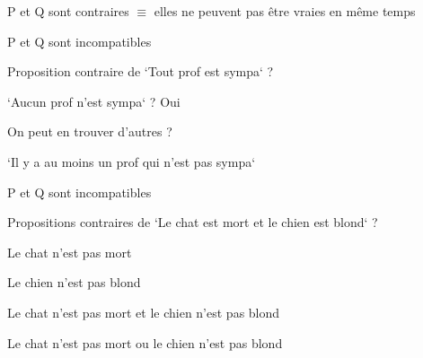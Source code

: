 \begin{frame}

			\begin{description}[labelindent=6pt,style=multiline,leftmargin=1.3in]
		 \setlength\itemsep{1em}
\item[Contraires] P et Q sont contraires $\equiv$ elles ne peuvent pas être vraies en même temps 
	 \pause
\item[En français] P et Q sont incompatibles\pause 
\item[Exemple] Proposition contraire de `Tout prof est sympa` ?\pause 
\item[] `Aucun prof n'est sympa` ? \pause Oui\pause
\item[] On peut en trouver d'autres ?\pause
\item[] `Il y a au moins un prof qui n'est pas sympa`
	\end{description}
\end{frame}



\begin{frame}

			\begin{description}[labelindent=6pt,style=multiline,leftmargin=1.3in]
		 \setlength\itemsep{1em}
\item[Contraires] P et Q sont incompatibles
	 \pause
\item[Exemple] Propositions contraires de `Le chat est mort et le chien est blond` ?\pause 
\item[] Le chat n'est pas mort \pause 
\item[] Le chien n'est pas blond\pause
\item[] Le chat n'est pas mort et le chien n'est pas blond\pause
\item[] Le chat n'est pas mort ou le chien n'est pas blond
	\end{description}
\end{frame}





